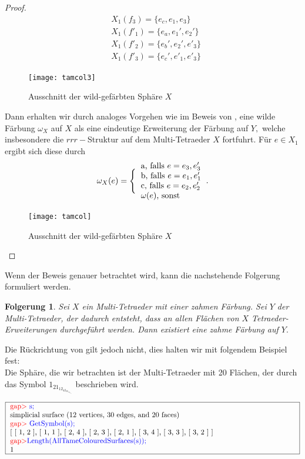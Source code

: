 \documentclass[12pt,titlepage,twoside,cleardoublepage]{article}
\theoremstyle{nummermitklammern}
\newtheorem{folgerung}[temp]{Folgerung}
\newtheorem{folgerung}[zahl]{Folgerung}
\numberwithin{equation}{section}
\begin{document}
\begin{proof}
\begin{align*}
&X_1(f_3)=\{e_c,e_1,e_3\}\\
&X_1(f'_1)=\{e_a,e_1',e_2'\}\\
&X_1(f'_2)=\{e_b',e_2',e'_3\}\\
&X_1(f'_3)=\{e_c',e'_1,e'_3\}
\end{align*}
\begin{figure}[H]
\begin{center}
\texttt{[image: tamcol3]}
\end{center}
\caption{Ausschnitt der wild-gefärbten Sphäre $X$}
\end{figure}
Dann erhalten wir durch analoges Vorgehen wie im Beweis von , eine wilde Färbung $\omega_X$ auf $X$ als eine eindeutige Erweiterung der Färbung auf $Y,$ welche insbesondere die $rrr-$Struktur auf dem Multi-Tetraeder $X$ fortfuhrt. Für $e\in X_1$ ergibt sich diese durch 
\begin{align*}
\omega_X(e)=\Biggl\{\begin{tabular}[l]{lcr}
a, falls $e=e_3,e_3'$\\
b, falls $e=e_1,e_1'$\\
c, falls $e=e_2,e_2'$\\
$\omega(e)$, sonst
\end{tabular}.
\end{align*}

\begin{figure}[H]
\begin{center}
\texttt{[image: tamcol]}
\end{center}
\caption{Ausschnitt der wild-gefärbten Sphäre $X$}
\end{figure}
\end{proof}
Wenn der Beweis genauer betrachtet wird, kann die nachstehende Folgerung formuliert werden.
\begin{folgerung}
Sei $X$ ein Multi-Tetraeder mit einer zahmen Färbung. Sei $Y$ der Multi-Tetraeder, der dadurch entsteht, dass an allen Flächen von $X$ Tetraeder-Erweiterungen durchgeführt werden. Dann existiert eine zahme Färbung auf $Y.$
\end{folgerung}
Die Rückrichtung von  gilt jedoch nicht, dies halten wir mit folgendem Beispiel fest:\\
Die Sphäre, die wir betrachten ist der Multi-Tetraeder mit 20 Flächen, der durch das Symbol $1_21_12_42_32_13_43_33_2$ beschrieben wird.
\begin{center}
$\fbox{
\parbox{14cm}{
\textcolor{red}{gap$>$} \textcolor{blue}{s;}\newline
simplicial surface (12 vertices, 30 edges, and 20 faces)\newline
\textcolor{red}{gap$>$} \textcolor{blue}{GetSymbol(s);}\newline
[ [ 1, 2 ], [ 1, 1 ], [ 2, 4 ], [ 2, 3 ], [ 2, 1 ], [ 3, 4 ], [ 3, 3 ],
  [ 3, 2 ] ]\newline
\textcolor{red}{gap$>$}\textcolor{blue}{ Length(AllTameColouredSurfaces(s));}\newline
1
}}$
\end{center}
\end{document}
